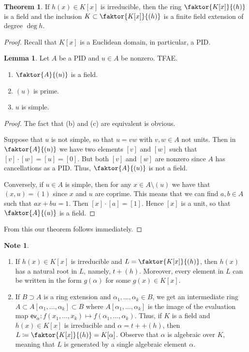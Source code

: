 \documentclass[10pt,letterpaper,cm]{nupset}
\theoremstyle{definition}
\newtheorem{note}[definition]{Note}
\theoremstyle{theorem}
\newtheorem{theorem}[definition]{Theorem}
\newtheorem{lemma}[definition]{Lemma}
\theoremstyle{remark}
\newcommand{\1}{\mathbf{1}}
\newcommand{\0}{\vec 0}
\begin{document}
\begin{theorem}
If $h(x) \in K[x]$ is irreducible, then the ring $\faktor{K[x]}{(h)}$ is a field and the inclusion $K \subset \faktor{K[x]}{(h)}$ is a finite field extension of degree $\deg{h}$.
\end{theorem}
\begin{proof}
Recall that $K[x]$ is a Euclidean domain, in particular, a PID.
\begin{lemma}
Let $A$ be a PID and $u\in A$ be nonzero. TFAE.
\begin{enumerate}[label=(\alph*)]
\item $\faktor{A}{(u)}$ is a field.
\item $\left(u\right)$ is prime.
\item$u$ is simple.
\end{enumerate}
\end{lemma}
\begin{proof}
The fact that (b) and (c) are equivalent is obvious. 

\medskip

 Suppose that $u$ is not simple, so that $u= vw$ with $v,w \in A$ not units. Then in $\faktor{A}{(u)}$ we have two elements $[v]$ and $[w]$ such that $[v]\cdot [w] = [u] = [0]$. But both $[v]$ and $[w]$ are nonzero since $A$ has cancellations as a PID. Thus, $\faktor{A}{(u)}$ is not a field.

\medskip

 Conversely, if $u\in A$ is simple, then for any $x\in A\setminus (u)$ we have that $\left(x,u\right) = \left(1\right)$ since $x$ and $u$ are coprime. This means that we can find $a,b\in A$ such that $ax + bu =1$. Then $[x]\cdot[a] = [1]$. Hence $[x]$ is a unit, so that $\faktor{A}{(u)}$ is a field. 
\end{proof}$ $From this our theorem follows immediately. 
\end{proof}

\begin{note} $ $
\begin{enumerate}
\item
If $h(x) \in K[x]$ is irreducible  and $L = \faktor{K[x]}{(h)}$, then $h(x)$ has a natural root in $L$, namely, $t + (h)$. Moreover, every element in $L$ can be written in the form $g(\alpha)$ for some $g(x) \in K[x]$.
\item
If $B \supset A$  is a ring extension and $\alpha_1, \ldots, \alpha_k \in B$, we get an intermediate ring $A \subset A[\alpha_1, \ldots, \alpha_k] \subset B$ where $A[\alpha_1, \ldots, \alpha_k] $ is the image of the evaluation map $\mathsf{ev}_{\alpha} : f(x_1, \ldots, x_k) \mapsto f(\alpha_1, \ldots, \alpha_k)$. Thus, if $K$ is a field and $h(x) \in K[x]$ is irreducible and $\alpha = t + +(h)$, then $L\coloneqq \faktor{K[x]}{(h)} = K[\alpha]$. Observe that $\alpha$ is algebraic over $K$, meaning that $L$ is generated by a single algebraic element $\alpha$.
\end{enumerate}
\end{note}
\end{document}
